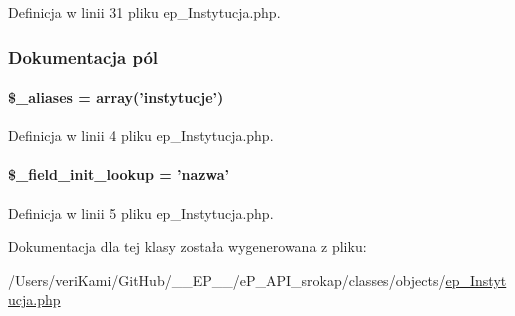 Definicja w linii 31 pliku ep\-\_\-\-Instytucja.\-php.



\subsubsection{Dokumentacja pól}
\hypertarget{classep___instytucja_ab4e31d75f0bc5d512456911e5d01366b}{
\paragraph[{\$\-\_\-aliases}]{\setlength{\rightskip}{0pt plus 5cm}\$\-\_\-aliases = array('instytucje')}}\label{classep___instytucja_ab4e31d75f0bc5d512456911e5d01366b}


Definicja w linii 4 pliku ep\-\_\-\-Instytucja.\-php.

\hypertarget{classep___instytucja_a4a4d54ae35428077a7c61ec8a5139af3}{
\paragraph[{\$\-\_\-field\-\_\-init\-\_\-lookup}]{\setlength{\rightskip}{0pt plus 5cm}\$\-\_\-field\-\_\-init\-\_\-lookup = 'nazwa'}}\label{classep___instytucja_a4a4d54ae35428077a7c61ec8a5139af3}


Definicja w linii 5 pliku ep\-\_\-\-Instytucja.\-php.



Dokumentacja dla tej klasy została wygenerowana z pliku\-:\begin{DoxyCompactItemize}
\item 
/\-Users/veri\-Kami/\-Git\-Hub/\-\_\-\-\_\-\-E\-P\-\_\-\-\_\-/e\-P\-\_\-\-A\-P\-I\-\_\-srokap/classes/objects/\hyperlink{ep___instytucja_8php}{ep\-\_\-\-Instytucja.\-php}\end{DoxyCompactItemize}
